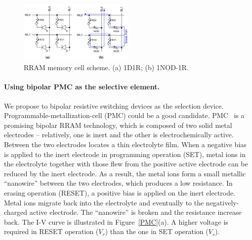 \begin{figure}\centering
\includegraphics[width=0.50\textwidth]{./figure/HL-RRAM2.png}
\caption{RRAM memory cell scheme. (a) 1D1R; (b) 1NOD-1R.}\label{RRAM2}
\end{figure}




\paragraph{Using bipolar PMC as the selective element.} We propose to bipolar resistive switching devices as the selection device. Programmable-metallization-cell (PMC) could be a good candidate. PMC~\cite{Kozicki05} is a promising bipolar RRAM technology, which is composed of two solid metal electrodes -- relatively, one is inert and the other is electrochemically active. Between the two electrodes locates a thin electrolyte film. When a negative bias is applied to the inert electrode in programming operation (SET), metal ions in the electrolyte together with those flew from the positive active electrode can be reduced by the inert electrode. As a result, the metal ions form a small metallic ``nanowire'' between the two electrodes, which produces a low resistance. In erasing operation (RESET), a positive bias is applied on the inert electrode. Metal ions migrate back into the electrolyte and eventually to the negatively-charged active electrode. The ``nanowire'' is broken and the resistance increase back. The I-V curve is illustrated in Figure~\ref{PMC}(a). A higher voltage is required in RESET operation ($V_r$) than the one in SET operation ($V_s$).


